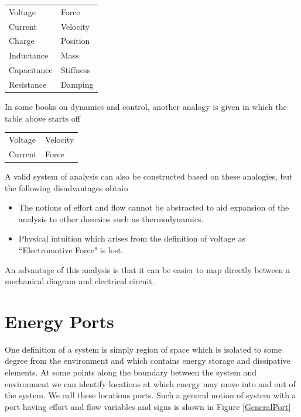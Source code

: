 \begin{tabular}{ll}
Voltage & Force\\
Current & Velocity\\
Charge & Position \\
Inductance & Mass\\
Capacitance & Stiffness\\
Resistance  & Damping \\
\end{tabular}


 In some books on dynamics and control, another analogy is given in which the table above starts off	%

\begin{tabular}{ll}
Voltage & Velocity\\
Current & Force\\
\end{tabular}

A valid system of analysis can also be constructed based on these analogies, but the following disadvantages obtain
\begin{itemize}
  \item The notions of effort and flow cannot be abstracted to aid expansion of the analysis to other domains such as thermodynamics.
  \item Physical intuition which arises from the definition of voltage as ``Electromotive Force" is lost.
\end{itemize}

An advantage of this analysis is that it can be easier to map directly between a mechanical diagram and electrical circuit.




\section{Energy Ports}

One definition of a system is simply  region of space which is isolated to some degree from the environment and which contains energy storage and dissipative elements.   At some points along the boundary between the system and environment we can identify locations at which energy may move into and out of the system.  We call these locations ports.  Such a general notion of system with a port having effort and flow variables and signs is shown in Figure \ref{GeneralPort}  	%

